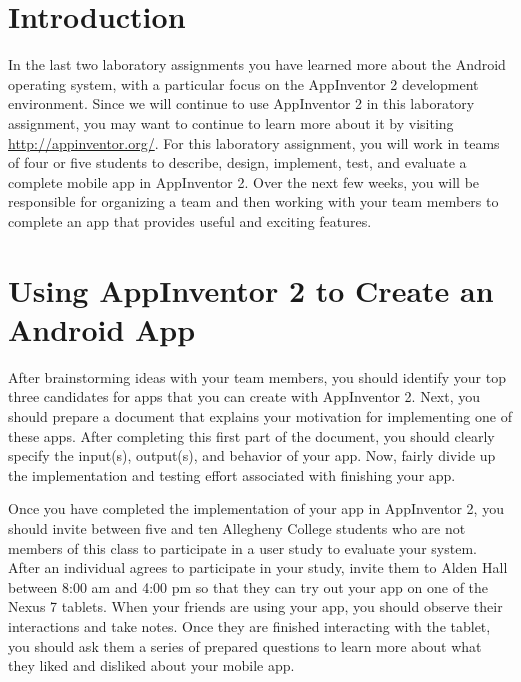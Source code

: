 


\usepackage[compact]{titlesec}



\section*{Introduction}

In the last two laboratory assignments you have learned more about the Android operating system, with a particular focus
on the AppInventor 2 development environment. Since we will continue to use AppInventor 2 in this laboratory assignment,
you may want to continue to learn more about it by visiting \url{http://appinventor.org/}.  For this laboratory
assignment, you will work in teams of four or five students to describe, design, implement, test, and evaluate a
complete mobile app in AppInventor 2.  Over the next few weeks, you will be responsible for organizing a team and then
working with your team members to complete an app that provides useful and exciting features.

\section*{Using AppInventor 2 to Create an Android App}

After brainstorming ideas with your team members, you should identify your top three candidates for apps that you can
create with AppInventor 2.  Next, you should prepare a document that explains your motivation for implementing one of
these apps.  After completing this first part of the document, you should clearly specify the input(s), output(s), and
behavior of your app. Now, fairly divide up the implementation and testing effort associated with finishing your app. 

Once you have completed the implementation of your app in AppInventor 2, you should invite between five and ten Allegheny
College students who are not members of this class to participate in a user study to evaluate your system.  After an
individual agrees to participate in your study, invite them to Alden Hall between 8:00 am and 4:00 pm so that they can
try out your app on one of the Nexus 7 tablets. When your friends are using your app, you should observe their
interactions and take notes.  Once they are finished interacting with the tablet, you should ask them a series of
prepared questions to learn more about what they liked and disliked about your mobile app.  

